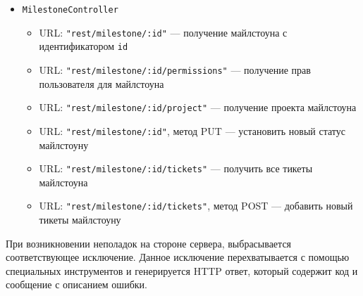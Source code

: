 \begin{itemize}
\item \texttt{MilestoneController}
	\begin{itemize}
	\item URL: \texttt{"rest/milestone/:id"} --- получение майлстоуна с идентификатором \texttt{id}
	\item URL: \texttt{"rest/milestone/:id/permissions"} --- получение прав пользователя для майлстоуна
	\item URL: \texttt{"rest/milestone/:id/project"} --- получение проекта майлстоуна
	\item URL: \texttt{"rest/milestone/:id"}, метод PUT --- установить новый статус майлстоуну
	\item URL: \texttt{"rest/milestone/:id/tickets"} --- получить все тикеты майлстоуна
	\item URL: \texttt{"rest/milestone/:id/tickets"}, метод POST --- добавить новый тикеты майлстоуну
	\end{itemize}	
\end{itemize}

При возникновении неполадок на стороне сервера, выбрасывается соответствующее исключение. Данное исключение перехватывается с помощью специальных инструментов и генерируется HTTP ответ, который содержит код и сообщение с описанием ошибки.

